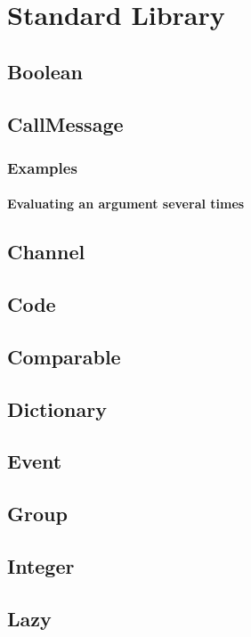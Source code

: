 \chapter{\us Standard Library}
\label{sec:stdlib}

\section{Boolean}
\section{CallMessage}
\label{sec:std-callmsg}
\subsection{Examples}
\subsubsection{Evaluating an argument several times}
\label{sec:std-callmsg-examples-several}
\section{Channel}
\section{Code}
\section{Comparable}
\section{Dictionary}
\section{Event}



\section{Group}
\section{Integer}
\section{Lazy}

